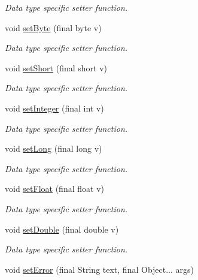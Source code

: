 \begin{DoxyCompactItemize}
\begin{DoxyCompactList}\small\item\em Data type specific setter function. \end{DoxyCompactList}\item 
void \mbox{\hyperlink{classorg_1_1libelektra_1_1Key_ab9576c2e1e526ee23904a50b02386b45}{set\+Byte}} (final byte v)
\begin{DoxyCompactList}\small\item\em Data type specific setter function. \end{DoxyCompactList}\item 
void \mbox{\hyperlink{classorg_1_1libelektra_1_1Key_ac1621a8d43992b40b6b20a0e45182376}{set\+Short}} (final short v)
\begin{DoxyCompactList}\small\item\em Data type specific setter function. \end{DoxyCompactList}\item 
void \mbox{\hyperlink{classorg_1_1libelektra_1_1Key_a290d278b4c11ea4bcabf82c0c97e6350}{set\+Integer}} (final int v)
\begin{DoxyCompactList}\small\item\em Data type specific setter function. \end{DoxyCompactList}\item 
void \mbox{\hyperlink{classorg_1_1libelektra_1_1Key_ac02de55fc0a3eb10372de7fa146db937}{set\+Long}} (final long v)
\begin{DoxyCompactList}\small\item\em Data type specific setter function. \end{DoxyCompactList}\item 
void \mbox{\hyperlink{classorg_1_1libelektra_1_1Key_a1436207a0efa244538c935766b8db470}{set\+Float}} (final float v)
\begin{DoxyCompactList}\small\item\em Data type specific setter function. \end{DoxyCompactList}\item 
void \mbox{\hyperlink{classorg_1_1libelektra_1_1Key_a2c411133e9a8d13df30d08041678a5a0}{set\+Double}} (final double v)
\begin{DoxyCompactList}\small\item\em Data type specific setter function. \end{DoxyCompactList}\item 
void \mbox{\hyperlink{classorg_1_1libelektra_1_1Key_a1f71503902725f238f81a1211eb5d9d5}{set\+Error}} (final String text, final Object... args)

\end{DoxyCompactItemize}
